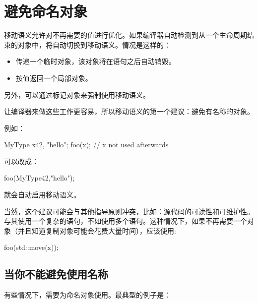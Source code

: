 \section{避免命名对象}
移动语义允许对不再需要的值进行优化。如果编译器自动检测到从一个生命周期结束的对象中，将自动切换到移动语义。情况是这样的：

\begin{itemize}
	\item 传递一个临时对象，该对象将在语句之后自动销毁。
	\item 按值返回一个局部对象。
\end{itemize}

另外，可以通过标记对象来强制使用移动语义。

让编译器来做这些工作更容易，所以移动语义的第一个建议：避免有名称的对象。

例如：

\begin{cppcode}
MyType x{42, "hello"};
foo(x); // x not used afterwards
\end{cppcode}

可以改成：

\begin{cppcode}
foo(MyType{42,"hello"});
\end{cppcode}

就会自动启用移动语义。

当然，这个建议可能会与其他指导原则冲突，比如：源代码的可读性和可维护性。与其使用一个复杂的语句，不如使用多个语句。这种情况下，如果不再需要一个对象（并且知道复制对象可能会花费大量时间），应该使用:

\begin{cppcode}
foo(std::move(x));
\end{cppcode}

\subsection{当你不能避免使用名称}

有些情况下，需要为命名对象使用。最典型的例子是：

